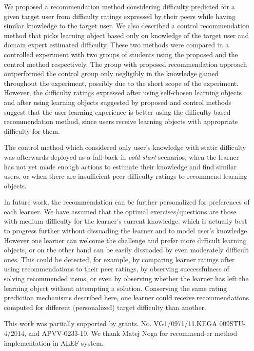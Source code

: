 \documentclass{llncs}
\begin{document}
We proposed a recommendation method considering difficulty predicted for a given target user from difficulty ratings expressed by their peers while having similar knowledge to the target user. We also described a control recommendation method that picks learning object based only on knowledge of the target user and domain expert estimated difficulty. These two methods were compared in a controlled experiment with two groups of students using the proposed and the control method respectively. The group with proposed recommendation approach outperformed the control group only negligibly in the knowledge gained throughout the experiment, possibly due to the short scope of the experiment. However, the difficulty ratings expressed after using self-chosen learning objects and after using learning objects suggested by proposed and control methods suggest that the user learning experience is better using the difficulty-based recommendation method, since users receive learning objects with appropriate difficulty for them.

The control method which considered only user’s knowledge with static difficulty was afterwards deployed as a fall-back in \emph{cold-start} scenarios, when the learner has not yet made enough actions to estimate their knowledge and find similar users, or when there are insufficient peer difficulty ratings to recommend learning objects.

In future work, the recommendation can be further personalized for preferences of each learner. We have assumed that the optimal exercises/questions are those with medium difficulty for the learner’s current knowledge, which is actually best to progress further without dissuading the learner and to model user's knowledge. However one learner can welcome the challenge and prefer more difficult learning objects, or on the other hand can be easily dissuaded by even moderately difficult ones. This could be detected, for example, by comparing learner ratings after using recommendations to their peer ratings, by observing successfulness of solving recommended items, or even by observing whether the learner has left the learning object without attempting a solution. Conserving the same rating prediction mechanisms described here, one learner could receive recommendations computed for different (personalized) target difficulty than another.

\textbf\ackname This work was partially supported by grants. No. VG1/0971/11,KEGA 009STU-4/2014, and APVV-0233-10. We thank Matej Noga for recommend-er method implementation in ALEF system.



\end{document}

